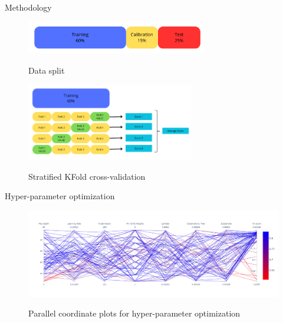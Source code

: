 \documentclass{beamer}
\begin{document}
\begin{frame}{Methodology}
\begin{figure}[h]
    \centering
    \includegraphics[width=0.7\textwidth]{Data splitting.png}\\
    \caption{Data split}
    \label{fig:Data split}
\end{figure}
\begin{figure}[h]
    \centering
    \includegraphics[width=0.65\textwidth]{KFold data.png}\\
    \caption{Stratified KFold cross-validation}
    \label{fig:KFold cross-validation}
\end{figure}
\end{frame}


\begin{frame}{Hyper-parameter optimization}
\begin{figure}[h]
    \centering
    \includegraphics[width=1\textwidth]{Random search XGB.png}\\
    \caption{Parallel coordinate plots for hyper-parameter optimization}
    \label{fig:Random search XGB}
\end{figure}
\end{frame}
\end{document}
